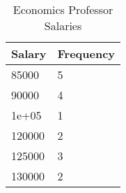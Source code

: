 \begin{table}[!htbp] \centering \renewcommand*{\arraystretch}{1.1}\caption{Economics Professor Salaries}\label{tab:describingvariables-profsalary}
\begin{tabular}{ll}
\hline
\hline
Salary & Frequency \\ 
\hline
85000 & 5 \\ 
90000 & 4 \\ 
1e+05 & 1 \\ 
120000 & 2 \\ 
125000 & 3 \\ 
130000 & 2\\ 
\hline
\hline
\end{tabular}
\end{table}

